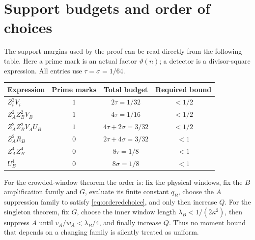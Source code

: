 \documentclass[11pt]{article}
\theoremstyle{remark}
\numberwithin{equation}{section}
\begin{document}
\appendix
\section{Support budgets and order of choices}\label{app:budgets}

The support margins used by the proof can be read directly from
the following table. Here a prime mark is an actual factor
$\vartheta(n)$; a detector is a divisor-square expression.
All entries use $\tau=\sigma=1/64$.

\begin{center}
\small
\begin{tabular}{@{}p{}ccc@{}}
\toprule
Expression & Prime marks & Total budget & Required bound\\
\midrule
$Z_i^2V_i$ & $1$ & $2\tau=1/32$ & $<1/2$\\
$Z_A^2Z_B^2V_B$ & $1$ & $4\tau=1/16$ & $<1/2$\\
$Z_A^2Z_B^2V_AU_B$ & $1$ & $4\tau+2\sigma=3/32$ & $<1/2$\\
$Z_A^2R_B$ & $0$ & $2\tau+4\sigma=3/32$ & $<1$\\
$Z_A^4Z_B^4$ & $0$ & $8\tau=1/8$ & $<1$\\
$U_B^4$ & $0$ & $8\sigma=1/8$ & $<1$\\
\bottomrule
\end{tabular}
\end{center}

For the crowded-window theorem the order is:
fix the physical windows, fix the $B$ amplification family
and $G$, evaluate its finite constant $q_B$, choose the
$A$ suppression family to satisfy \eqref{eq:orderedchoice},
and only then increase $Q$.
For the singleton theorem, fix $G$, choose the inner window
length $\lambda_B<1/(2\kappa^2)$, then suppress $A$ until
$v_A/w_A<\lambda_B/4$, and finally increase $Q$.
Thus no moment bound that depends on a changing family is
silently treated as uniform.
\end{document}
